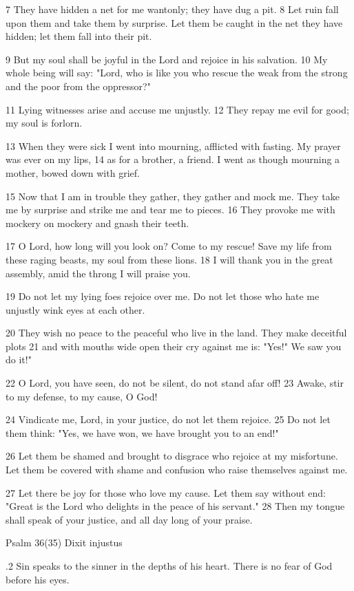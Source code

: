 7 They have hidden a net for me wantonly;
they have dug a pit.
8 Let ruin fall upon them
and take them by surprise.
Let them be caught in the net they have hidden;
let them fall into their pit.

9 But my soul shall be joyful in the Lord
and rejoice in his salvation.
10 My whole being will say:
"Lord, who is like you
who rescue the weak from the strong
and the poor from the oppressor?"

11 Lying witnesses arise
and accuse me unjustly.
12 They repay me evil for good;
my soul is forlorn.

13 When they were sick I went into mourning,
afflicted with fasting.
My prayer was ever on my lips,
14 as for a brother, a friend.
I went as though mourning a mother,
bowed down with grief.

15 Now that I am in trouble they gather,
they gather and mock me.
They take me by surprise and strike me
and tear me to pieces.
16 They provoke me with mockery on mockery
and gnash their teeth.

17 O Lord, how long will you look on?
Come to my rescue!
Save my life from these raging beasts,
my soul from these lions.
18 I will thank you in the great assembly,
amid the throng I will praise you.

19 Do not let my lying foes
rejoice over me.
Do not let those who hate me unjustly
wink eyes at each other.

20 They wish no peace to the peaceful
who live in the land.
They make deceitful plots
21 and with mouths wide open
their cry against me is: "Yes!"
We saw you do it!"

22 O Lord, you have seen, do not be silent,
do not stand afar off!
23 Awake, stir to my defense,
to my cause, O God!

24 Vindicate me, Lord, in your justice,
do not let them rejoice.
25 Do not let them think: "Yes, we have won,
we have brought you to an end!"

26 Let them be shamed and brought to disgrace
who rejoice at my misfortune.
Let them be covered with shame and confusion
who raise themselves against me.

27 Let there be joy for those who love my cause.
Let them say without end:
"Great is the Lord who delights
in the peace of his servant."
28 Then my tongue shall speak of your justice,
and all day long of your praise.


Psalm 36(35) Dixit injustus

.2 Sin speaks to the sinner
in the depths of his heart.
There is no fear of God
before his eyes.

